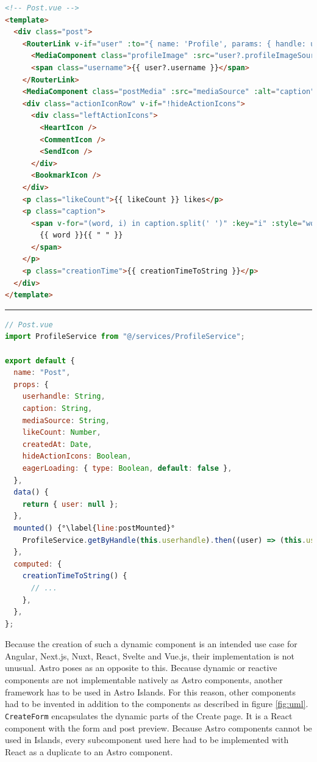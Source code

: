\documentclass[a4paper, 12pt]{article}
\begin{document}
\vspace{1cm}
\begin{lstlisting}[caption=Post in Vue.js (Template), label={lst:Vue:Post:Template}, language=HTML]
<!-- Post.vue -->
<template>
  <div class="post">
    <RouterLink v-if="user" :to="{ name: 'Profile', params: { handle: userhandle } }" class="postUserInfo" >
      <MediaComponent class="profileImage" :src="user?.profileImageSource" alt="" width="44" height="44" />
      <span class="username">{{ user?.username }}</span>
    </RouterLink>
    <MediaComponent class="postMedia" :src="mediaSource" :alt="caption" width="100%" height="100%" :eagerLoading="eagerLoading" />
    <div class="actionIconRow" v-if="!hideActionIcons">
      <div class="leftActionIcons">
        <HeartIcon />
        <CommentIcon />
        <SendIcon />
      </div>
      <BookmarkIcon />
    </div>
    <p class="likeCount">{{ likeCount }} likes</p>
    <p class="caption">
      <span v-for="(word, i) in caption.split(' ')" :key="i" :style="word.startsWith('#') ? 'color: #0091E2' : ''">
        {{ word }}{{ " " }}
      </span>
    </p>
    <p class="creationTime">{{ creationTimeToString }}</p>
  </div>
</template>
\end{lstlisting}
\hrule
\begin{lstlisting}[caption=Post in Vue.js (Script), label={lst:Vue:Post:Script}, language=JavaScript, firstnumber=26, escapechar=°]
// Post.vue
import ProfileService from "@/services/ProfileService";

export default {
  name: "Post",
  props: {
    userhandle: String,
    caption: String,
    mediaSource: String,
    likeCount: Number,
    createdAt: Date,
    hideActionIcons: Boolean,
    eagerLoading: { type: Boolean, default: false },
  },
  data() {
    return { user: null };
  },
  mounted() {°\label{line:postMounted}°
    ProfileService.getByHandle(this.userhandle).then((user) => (this.user = user));
  },
  computed: {
    creationTimeToString() {
      // ...
    },
  },
};
\end{lstlisting}
\vspace{1cm}

Because the creation of such a dynamic component is an intended use case for Angular, Next.js, Nuxt, React, Svelte and Vue.js, their implementation is not unusual.
Astro poses as an opposite to this.
Because dynamic or reactive components are not implementable natively as Astro components, another framework has to be used in Astro Islands.
For this reason, other components had to be invented in addition to the components as described in figure \ref{fig:uml}.
\verb|CreateForm| encapsulates the dynamic parts of the Create page.
It is a React component with the form and post preview.
Because Astro components cannot be used in Islands, every subcomponent used here had to be implemented with React as a duplicate to an Astro component.
\end{document}
